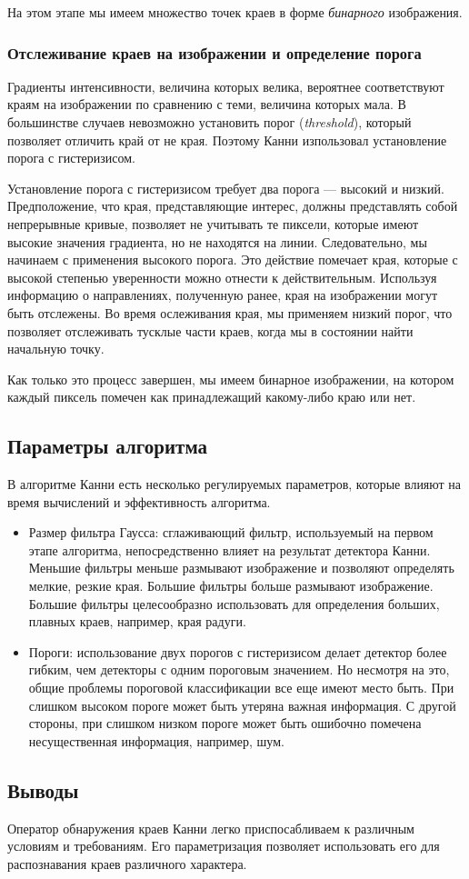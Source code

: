 На этом этапе мы имеем множество точек краев в форме \emph{бинарного} изображения.

\subsubsection{Отслеживание краев на изображении и определение порога}
Градиенты интенсивности, величина которых велика, вероятнее соответствуют краям на изображении по сравнению с теми, величина которых мала. В большинстве случаев невозможно установить порог (\emph{threshold}), который позволяет отличить край от не края. Поэтому Канни изпользовал установление порога с гистеризисом.

Установление порога с гистеризисом требует два порога --- высокий и низкий. Предположение, что края, представляющие интерес, должны представлять собой непрерывные кривые, позволяет не учитывать те пиксели, которые имеют высокие значения градиента, но не находятся на линии. Следовательно, мы начинаем с применения высокого порога. Это действие помечает края, которые с высокой степенью уверенности можно отнести к действительным. Используя информацию о направлениях, полученную ранее, края на изображении могут быть отслежены. Во время ослеживания края, мы применяем низкий порог, что позволяет отслеживать тусклые части краев, когда мы в состоянии найти начальную точку.

Как только это процесс завершен, мы имеем бинарное изображении, на котором каждый пиксель помечен как принадлежащий какому-либо краю или нет.

\subsection{Параметры алгоритма}
В алгоритме Канни есть несколько регулируемых параметров, которые влияют на время вычислений и эффективность алгоритма.
\begin{itemize}
  \item Размер фильтра Гаусса: сглаживающий фильтр, используемый на первом этапе алгоритма, непосредственно влияет на результат детектора Канни. Меньшие фильтры меньше размывают изображение и позволяют определять мелкие, резкие края. Большие фильтры больше размывают изображение. Большие фильтры целесообразно использовать для определения больших, плавных краев, например, края радуги.
  \item Пороги: использование двух порогов с гистеризисом делает детектор более гибким, чем детекторы с одним пороговым значением. Но несмотря на это, общие проблемы пороговой классификации все еще имеют место быть. При слишком высоком пороге может быть утеряна важная информация. С другой стороны, при слишком низком пороге может быть ошибочно помечена несущественная информация, например, шум.
\end{itemize}

\subsection{Выводы}
Оператор обнаружения краев Канни легко приспосабливаем к различным условиям и требованиям. Его параметризация позволяет использовать его для распознавания краев различного характера.

\newpage
